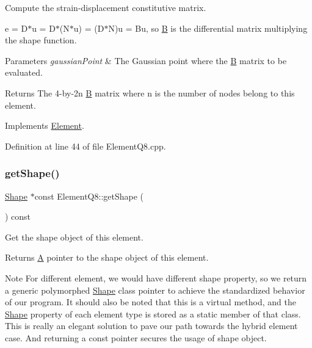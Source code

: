 Compute the strain-\/displacement constitutive matrix. 

e = D$\ast$u = D$\ast$(N$\ast$u) = (D$\ast$N)u = Bu, so \mbox{\hyperlink{class_b}{B}} is the differential matrix multiplying the shape function.


\begin{DoxyParams}{Parameters}
{\em gaussian\+Point} & The Gaussian point where the \mbox{\hyperlink{class_b}{B}} matrix to be evaluated. \\
\hline
\end{DoxyParams}
\begin{DoxyReturn}{Returns}
The 4-\/by-\/2n \mbox{\hyperlink{class_b}{B}} matrix where n is the number of nodes belong to this element. 
\end{DoxyReturn}


Implements \mbox{\hyperlink{class_element_ae3c88315d1a30addff6379a9089465ca}{Element}}.



Definition at line 44 of file Element\+Q8.\+cpp.

\mbox{\label{class_element_q8_a06118e8d0c0a0cb247c249f22e11eeaf}} 
\subsubsection{\texorpdfstring{get\+Shape()}{getShape()}}
{\footnotesize\ttfamily \mbox{\hyperlink{class_shape}{Shape}} $\ast$const Element\+Q8\+::get\+Shape (\begin{DoxyParamCaption}{ }\end{DoxyParamCaption}) const\hspace{0.3cm}{\ttfamily [virtual]}}



Get the shape object of this element. 

\begin{DoxyReturn}{Returns}
\mbox{\hyperlink{class_a}{A}} pointer to the shape object of this element.
\end{DoxyReturn}
\begin{DoxyNote}{Note}
For different element, we would have different shape property, so we return a generic polymorphed \mbox{\hyperlink{class_shape}{Shape}} class pointer to achieve the standardized behavior of our program. It should also be noted that this is a virtual method, and the \mbox{\hyperlink{class_shape}{Shape}} property of each element type is stored as a static member of that class. This is really an elegant solution to pave our path towards the hybrid element case. And returning a const pointer secures the usage of shape object. 
\end{DoxyNote}


